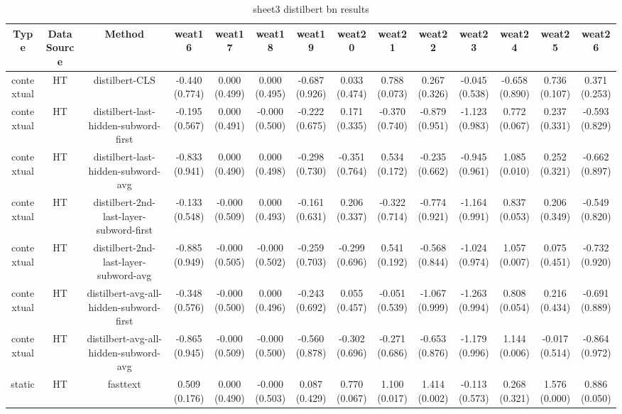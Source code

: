 \begin{sidewaystable}[htb]
    \centering
    \caption{sheet3 distilbert bn results}
    \label{appendix_tab:sheet3_distilbert_bn_results}
    \small
    \begin{tabular}{@{}cccccccccccccc@{}}
        \toprule
        Type & DataSource & Method & weat16 & weat17 & weat18 & weat19 & weat20 & weat21 & weat22 & weat23 & weat24 & weat25 & weat26 \\
        \midrule
        contextual & HT & distilbert-CLS & -0.440 (0.774) & 0.000 (0.499) & 0.000 (0.495) & -0.687 (0.926) & 0.033 (0.474) & 0.788 (0.073) & 0.267 (0.326) & -0.045 (0.538) & -0.658 (0.890) & 0.736 (0.107) & 0.371 (0.253) \\
        contextual & HT & distilbert-last-hidden-subword-first & -0.195 (0.567) & 0.000 (0.491) & -0.000 (0.500) & -0.222 (0.675) & 0.171 (0.335) & -0.370 (0.740) & -0.879 (0.951) & -1.123 (0.983) & 0.772 (0.067) & 0.237 (0.331) & -0.593 (0.829) \\
        contextual & HT & distilbert-last-hidden-subword-avg & -0.833 (0.941) & 0.000 (0.490) & 0.000 (0.498) & -0.298 (0.730) & -0.351 (0.764) & 0.534 (0.172) & -0.235 (0.662) & -0.945 (0.961) & 1.085 (0.010) & 0.252 (0.321) & -0.662 (0.897) \\
        contextual & HT & distilbert-2nd-last-layer-subword-first & -0.133 (0.548) & -0.000 (0.509) & 0.000 (0.493) & -0.161 (0.631) & 0.206 (0.337) & -0.322 (0.714) & -0.774 (0.921) & -1.164 (0.991) & 0.837 (0.053) & 0.206 (0.349) & -0.549 (0.820) \\
        contextual & HT & distilbert-2nd-last-layer-subword-avg & -0.885 (0.949) & -0.000 (0.505) & -0.000 (0.502) & -0.259 (0.703) & -0.299 (0.696) & 0.541 (0.192) & -0.568 (0.844) & -1.024 (0.974) & 1.057 (0.007) & 0.075 (0.451) & -0.732 (0.920) \\
        contextual & HT & distilbert-avg-all-hidden-subword-first & -0.348 (0.576) & -0.000 (0.500) & 0.000 (0.496) & -0.243 (0.692) & 0.055 (0.457) & -0.051 (0.539) & -1.067 (0.999) & -1.263 (0.994) & 0.808 (0.054) & 0.216 (0.434) & -0.691 (0.889) \\
        contextual & HT & distilbert-avg-all-hidden-subword-avg & -0.865 (0.945) & -0.000 (0.509) & -0.000 (0.500) & -0.560 (0.878) & -0.302 (0.696) & -0.271 (0.686) & -0.653 (0.876) & -1.179 (0.996) & 1.144 (0.006) & -0.017 (0.514) & -0.864 (0.972) \\
        static & HT & fasttext & 0.509 (0.176) & 0.000 (0.490) & -0.000 (0.503) & 0.087 (0.429) & 0.770 (0.067) & 1.100 (0.017) & 1.414 (0.002) & -0.113 (0.573) & 0.268 (0.321) & 1.576 (0.000) & 0.886 (0.050) \\

\end{tabular}
\end{sidewaystable}
